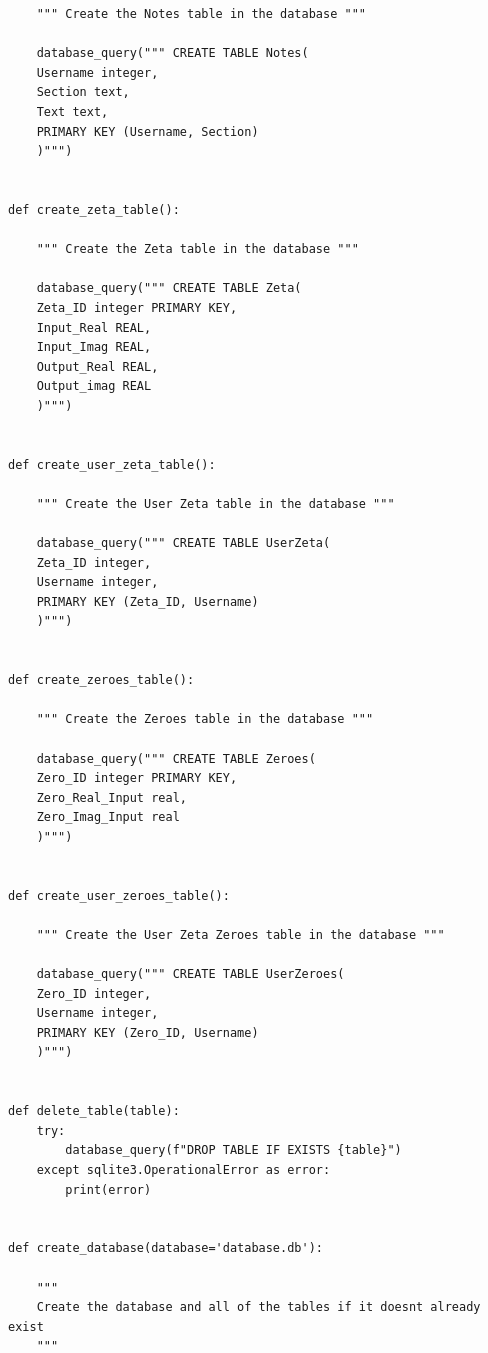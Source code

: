 \documentclass[12pt]{article}
\begin{document}
\begin{lstlisting}
    """ Create the Notes table in the database """

    database_query(""" CREATE TABLE Notes(
    Username integer,
    Section text,
    Text text,
    PRIMARY KEY (Username, Section)
    )""")


def create_zeta_table():

    """ Create the Zeta table in the database """

    database_query(""" CREATE TABLE Zeta(
    Zeta_ID integer PRIMARY KEY,
    Input_Real REAL,
    Input_Imag REAL,
    Output_Real REAL,
    Output_imag REAL
    )""")


def create_user_zeta_table():

    """ Create the User Zeta table in the database """

    database_query(""" CREATE TABLE UserZeta(
    Zeta_ID integer,
    Username integer,
    PRIMARY KEY (Zeta_ID, Username)
    )""")


def create_zeroes_table():

    """ Create the Zeroes table in the database """

    database_query(""" CREATE TABLE Zeroes(
    Zero_ID integer PRIMARY KEY,
    Zero_Real_Input real,
    Zero_Imag_Input real
    )""")


def create_user_zeroes_table():

    """ Create the User Zeta Zeroes table in the database """

    database_query(""" CREATE TABLE UserZeroes(
    Zero_ID integer,
    Username integer,
    PRIMARY KEY (Zero_ID, Username)
    )""")


def delete_table(table):
    try:
        database_query(f"DROP TABLE IF EXISTS {table}")
    except sqlite3.OperationalError as error:
        print(error)


def create_database(database='database.db'):

    """
    Create the database and all of the tables if it doesnt already exist
    """


\end{lstlisting}
\end{document}
